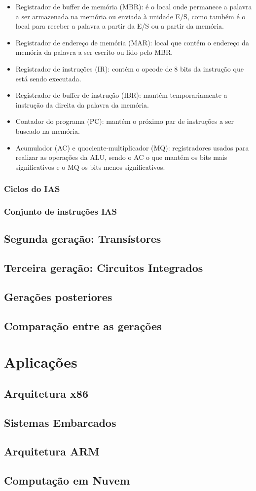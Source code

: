 \documentclass{article}
\begin{document}
\begin{itemize}
	\item Registrador de buffer de memória (MBR): é o local onde permanece a palavra a ser armazenada na memória ou enviada à unidade E/S, como também é o local para receber a palavra a partir da E/S ou a partir da memória.
	\item Registrador de endereço de memória (MAR): local que contém o endereço da memória da palavra a ser escrito ou lido pelo MBR.
	\item Registrador de instruções (IR): contém o opcode de 8 bits da instrução que está sendo executada.
	\item Registrador de buffer de instrução (IBR): mantém temporariamente a instrução da direita da palavra da memória.
	\item Contador do programa (PC): mantém o próximo par de instruções a ser buscado na memória.
	\item Acumulador (AC) e quociente-multiplicador (MQ): registradores usados para realizar as operações da ALU, sendo o AC o que mantém os bits mais significativos e o MQ os bits menos significativos.
\end{itemize}

\subsubsection{Ciclos do IAS}
\subsubsection{Conjunto de instruções IAS}
\subsection{Segunda geração: Transístores}
\subsection{Terceira geração: Circuitos Integrados}
\subsection{Gerações posteriores}
\subsection{Comparação entre as gerações}

\section{Aplicações} 
\subsection{Arquitetura x86} 
\subsection{Sistemas Embarcados}
\subsection{Arquitetura ARM} 
\subsection{Computação em Nuvem}
\end{document}
